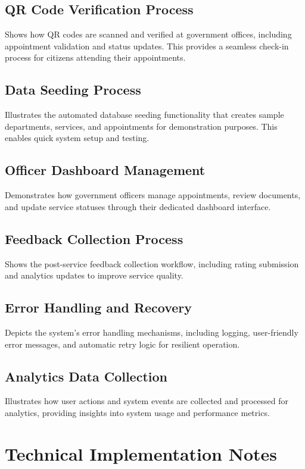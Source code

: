 \documentclass[12pt,a4paper]{article}
\begin{document}
\subsection{QR Code Verification Process}
Shows how QR codes are scanned and verified at government offices, including appointment validation and status updates. This provides a seamless check-in process for citizens attending their appointments.

\subsection{Data Seeding Process}
Illustrates the automated database seeding functionality that creates sample departments, services, and appointments for demonstration purposes. This enables quick system setup and testing.

\subsection{Officer Dashboard Management}
Demonstrates how government officers manage appointments, review documents, and update service statuses through their dedicated dashboard interface.

\subsection{Feedback Collection Process}
Shows the post-service feedback collection workflow, including rating submission and analytics updates to improve service quality.

\subsection{Error Handling and Recovery}
Depicts the system's error handling mechanisms, including logging, user-friendly error messages, and automatic retry logic for resilient operation.

\subsection{Analytics Data Collection}
Illustrates how user actions and system events are collected and processed for analytics, providing insights into system usage and performance metrics.

\section{Technical Implementation Notes}
\end{document}
